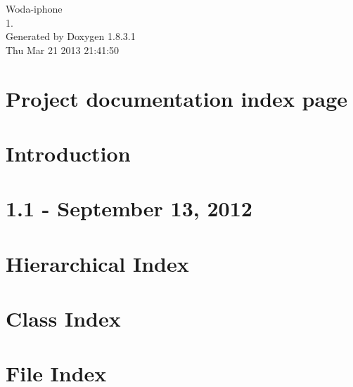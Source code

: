 \documentclass{book}
\begin{document}
\hypersetup{pageanchor=false,citecolor=blue}
\begin{titlepage}
\vspace*{7cm}
\begin{center}
{\Large Woda-\/iphone \\[1ex]\large 1. }\\
\vspace*{1cm}
{\large Generated by Doxygen 1.8.3.1}\\
\vspace*{0.5cm}
{\small Thu Mar 21 2013 21:41:50}\\
\end{center}
\end{titlepage}
\clearemptydoublepage
{}
\tableofcontents
\clearemptydoublepage
{}
\hypersetup{pageanchor=true,citecolor=blue}
\chapter{Project documentation index page}
\label{index}\hypertarget{index}{}
\chapter{Introduction}
\label{md_README}
\hypertarget{md_README}{}

\chapter{1.1 -\/ September 13, 2012}
\label{md_release_notes}
\hypertarget{md_release_notes}{}

\chapter{Hierarchical Index}

\chapter{Class Index}

\chapter{File Index}

\end{document}
